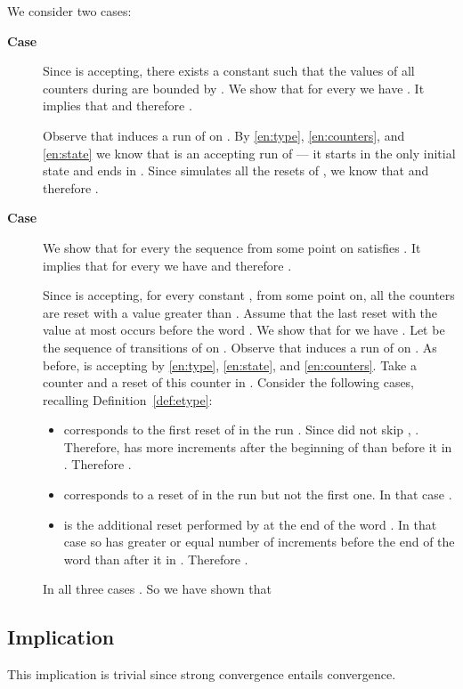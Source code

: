 \documentclass{LMCS}
\begin{document}
We consider two cases:
\begin{description}
\item[\bf Case ] Since  is accepting, there exists a constant  such that the values of all counters during  are bounded by . We show that for every  we have . It implies that  and therefore .

Observe that  induces a run  of  on . By \ref{en:type}, \ref{en:counters}, and \ref{en:state} we know that  is an accepting run of  --- it starts in the only initial state and ends in . Since  simulates all the resets of , we know that  and therefore .

\item[\bf Case ] We show that for every  the sequence  from some point on satisfies . It implies that for every  we have  and therefore .

Since  is accepting, for every constant , from some point on, all the counters are reset with a value greater than . Assume that the last reset with the value at most  occurs before the word . We show that for  we have . Let  be the sequence of transitions of  on . Observe that  induces a run  of  on . As before,  is accepting by \ref{en:type}, \ref{en:state}, and \ref{en:counters}. Take a counter  and a reset of this counter  in . Consider the following cases, recalling Definition~\ref{def:etype}:

\begin{itemize}
\item  corresponds to the first reset of  in the run . Since  did not skip , . Therefore,  has more increments after the beginning of  than before it in . Therefore .
\item  corresponds to a reset of  in the run  but not the first one. In that case .
\item  is the additional reset performed by  at the end of the word . In that case  so  has greater or equal number of increments before the end of the word  than after it in . Therefore .
\end{itemize}

In all three cases . So we have shown that

\end{description}

\subsection{Implication }

This implication is trivial since strong convergence entails convergence.
\end{document}
